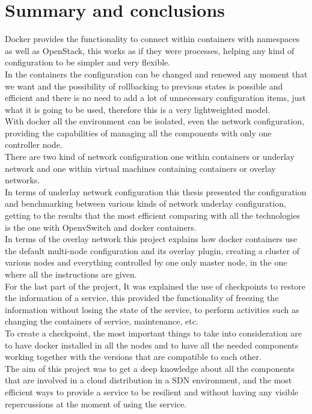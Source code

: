

\chapter{Summary and conclusions}

Docker provides the functionality to connect within containers with namespaces as well as OpenStack, this works as if they were processes, helping any kind of configuration to be simpler and very flexible. \\

In the containers the configuration can be changed and renewed any moment that we want and the possibility of rollbacking to previous states is possible and efficient and there is no need to add a lot of unnecessary configuration items, just what it is going to be used, therefore this is a very lightweighted model.\\

With docker all the environment can be isolated, even the network configuration, providing the capabilities of managing all the components with only one controller node.\\

There are two kind of network configuration one within containers or underlay network and one within virtual machines containing containers or overlay networks.\\

In terms of underlay network configuration this thesis presented the configuration and benchmarking between various kinds of network underlay configuration, getting to the results that the most efficient comparing with all the technologies is the one with OpenvSwitch and docker containers.\\

In terms of the overlay network this project explains how docker containers use the default multi-node configuration and its overlay plugin, creating a cluster of various nodes and everything controlled by one only master node, in the one where all the instructions are given.\\

For the last part of the project, It was explained the use of checkpoints to restore the information of a service, this provided the functionality of freezing the information without losing the state of the service, to perform activities such as changing the containers of service, maintenance, etc.\\

To create a checkpoint, the most important things to take into consideration are to have docker installed in all the nodes and to have all the needed components working together with the versions that are compatible to each other.\\

The aim of this project was to get a deep knowledge about all the components that are involved in a cloud distribution in a SDN environment, and the most efficient ways to provide a service to be resilient and without having any visible repercussions at the moment of using the service.


